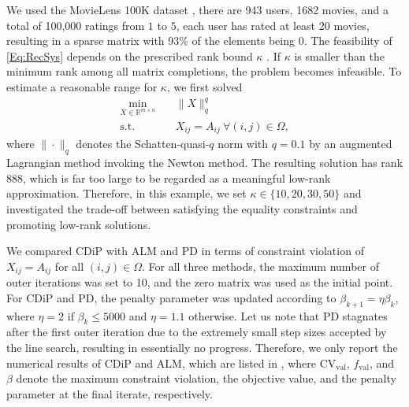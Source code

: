 \documentclass[11pt,a4paper,reqno]{amsart}
\begin{document}
{ We used the MovieLens 100K dataset \cite{henrion2002calmness}, %
 there are 943 users, 1682 movies, and a total of 100,000 ratings from $1$ to $5$, each user has rated at least 20 movies, resulting in a sparse matrix with 93\% of the elements being $0$. The feasibility of \eqref{Eq:RecSys} depends on the prescribed rank bound $\kappa$ . If $\kappa$ is smaller than the minimum rank among all matrix completions, the problem becomes infeasible. To estimate a reasonable range for $\kappa$, we first solved
\begin{equation}\label{Eq:Schatten}
\begin{aligned}
    \min_{X\in\mathbb{R}^{m\times n}}\quad &
    \|X\|^q_{q}\\
    \text{s.t.}\quad &
    X_{ij}=A_{ij}\ \forall (i,j)\in\Omega,
\end{aligned}
\end{equation}
where $
\|\cdot\|_{q}$
denotes the Schatten-quasi-$q$ norm with $q=0.1$ by an augmented Lagrangian method invoking the Newton method. The resulting solution has rank 888, which is far too large to be regarded as a meaningful low-rank approximation. Therefore, in this example, we set $\kappa \in \{10,20,30, 50\}$ and investigated the trade-off between satisfying the equality constraints and promoting low-rank solutions.

We compared CDiP with ALM and PD in terms of constraint violation of $X_{ij}=A_{ij}$ for all $(i,j)\in\Omega$. For all three methods, the maximum number of outer iterations was set to 10, and the zero matrix was used as the initial point. For CDiP and PD, the penalty parameter was updated according to $\beta_{k+1}=\eta\beta_k$, where $\eta=2$ if $\beta_k\le 5000$ and $\eta=1.1$ otherwise. Let us note that PD stagnates after the first outer iteration due to the extremely small step sizes accepted by the line search, resulting in essentially no progress. Therefore, we only report the numerical results of CDiP and ALM, which are listed in , where ${\text{CV}}_{\mathrm{val}}$, $f_{\mathrm{val}}$, and $\beta$ denote the maximum constraint violation, the objective value, and the penalty parameter at the final iterate, respectively.

}
\end{document}
